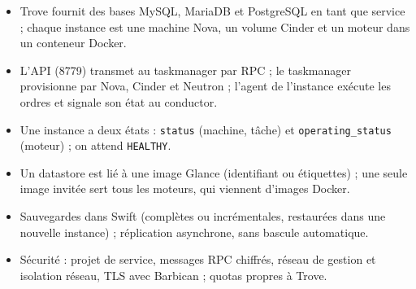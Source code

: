 \begin{aretenir}
\begin{itemize}
  \item Trove fournit des bases MySQL, MariaDB et PostgreSQL en tant que service ; chaque instance est une machine Nova, un volume Cinder
        et un moteur dans un conteneur Docker.
  \item L'API (8779) transmet au taskmanager par RPC ; le taskmanager provisionne par Nova, Cinder et Neutron ; l'agent de l'instance
        exécute les ordres et signale son état au conductor.
  \item Une instance a deux états : \texttt{status} (machine, tâche) et \texttt{operating\_status} (moteur) ; on attend \texttt{HEALTHY}.
  \item Un datastore est lié à une image Glance (identifiant ou étiquettes) ; une seule image invitée sert tous les moteurs, qui viennent
        d'images Docker.
  \item Sauvegardes dans Swift (complètes ou incrémentales, restaurées dans une nouvelle instance) ; réplication asynchrone, sans bascule
        automatique.
  \item Sécurité : projet de service, messages RPC chiffrés, réseau de gestion et isolation réseau, TLS avec Barbican ; quotas propres à
        Trove.
\end{itemize}
\end{aretenir}

